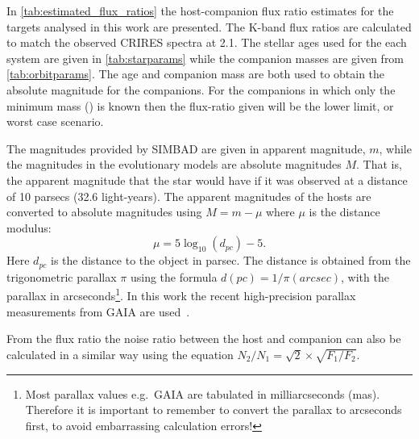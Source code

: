 In \cref{tab:estimated_flux_ratios} the host-companion flux ratio estimates for the targets analysed in this work are presented.
The {K}-band flux ratios are calculated to match the observed {CRIRES} spectra at 2.1\um{}.
The stellar ages used for the each system are given in \cref{tab:starparams} while the companion masses are given from \cref{tab:orbitparams}.
The age and companion mass are both used to obtain the absolute magnitude for the companions.
For the companions in which only the minimum mass (\Mtwosini{}) is known then the flux-ratio given will be the lower limit, or worst case scenario.


The magnitudes provided by {SIMBAD} are given in apparent magnitude, $m$, while the magnitudes in the evolutionary models are absolute magnitudes $M$.
That is, the apparent magnitude that the star would have if it was observed at a distance of 10 parsecs (32.6 light-years).
The apparent magnitudes of the hosts are converted to absolute magnitudes using \(M = m - \mu\) where \(\mu\) is the distance modulus:
\begin{equation}
\mu = 5 \log_{10}(d_{pc}) -5. \label{eqn:distance_modulus}
\end{equation}
Here $d_{pc}$ is the distance to the object in parsec.
The distance is obtained from the trigonometric parallax  $\pi$ using the formula $d(pc) = 1 /\pi(arcsec)$, with the parallax in arcseconds\footnote{Most parallax values e.g.\ GAIA are tabulated in milliarcseconds (mas).
Therefore it is important to remember to convert the parallax to arcseconds first, to avoid embarrassing calculation errors!}.
In this work the recent high-precision parallax measurements from GAIA are used~\citet{collaboration_gaia_2018}.

From the flux ratio the noise ratio between the host and companion can also be calculated in a similar way using the equation \(N_{2}/N_{1} = \sqrt{2} \times\sqrt{F_{1}/F_{2}}\).


